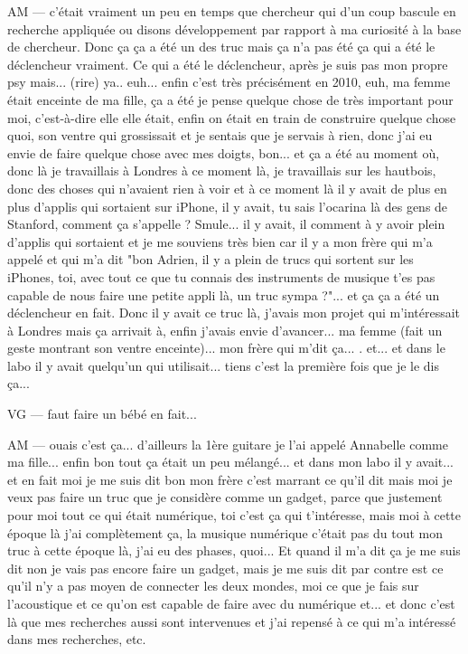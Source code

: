 AM — c'était vraiment un peu en temps que chercheur qui d'un coup bascule en recherche appliquée ou disons développement par rapport à ma curiosité à la base de chercheur. Donc ça ça a été un des truc mais ça n'a pas été ça qui a été le déclencheur vraiment.
Ce qui a été le déclencheur, après je suis pas mon propre psy mais... (rire) ya.. euh... enfin c'est très précisément en 2010, euh, ma femme était enceinte de ma fille, ça a été je pense  quelque chose de très important pour moi, c'est-à-dire elle elle était, enfin on était en train de construire quelque chose quoi, son ventre qui grossissait et je sentais que je servais à rien, donc j'ai eu envie de faire quelque chose avec mes doigts, bon... 
et ça a été au moment où, donc là je travaillais à Londres à ce moment là, je travaillais sur les hautbois, donc des choses qui n'avaient rien à voir et à ce moment là il y avait de plus en plus d'applis qui sortaient sur iPhone, il y avait, tu sais l'ocarina là des gens de Stanford, comment ça s'appelle ? Smule... il y avait, il comment à y avoir plein d'applis qui sortaient et je me souviens très bien car il y a mon frère qui m'a appelé et qui m'a dit "bon Adrien, il y a plein de trucs qui sortent sur les iPhones, toi, avec tout ce que tu connais des instruments de musique t'es pas capable de nous faire une petite appli là, un truc sympa ?"... et ça ça a été un déclencheur en fait.
Donc il y avait ce truc là, j'avais mon projet qui m'intéressait à Londres mais ça arrivait à, enfin j'avais envie d'avancer... ma femme (fait un geste montrant son ventre enceinte)... mon frère qui m'dit ça... . et... et dans le labo il y avait quelqu'un qui utilisait... tiens c'est la première fois que je le dis ça... 

VG — faut faire un bébé en fait... 

AM — ouais c'est ça... d'ailleurs la 1ère guitare je l'ai appelé Annabelle comme ma fille... enfin bon tout ça était un peu mélangé... 
et dans mon labo il y avait... et en fait moi je me suis dit bon mon frère c'est marrant ce qu'il dit mais moi je veux pas faire un truc que je considère comme un gadget, parce que justement pour moi tout ce qui était numérique, toi c'est ça qui t'intéresse, mais moi à cette époque là j'ai complètement ça, la musique numérique c'était pas du  tout mon truc à cette époque là, j'ai eu des phases, quoi... Et quand il m'a dit ça je me suis dit non je vais pas encore faire un gadget,  mais je me suis dit par contre est ce qu'il n'y a pas moyen de connecter les deux mondes, moi ce que je fais sur l'acoustique et ce qu'on est capable de faire avec du numérique et... et donc c'est là que mes recherches aussi sont intervenues et j'ai repensé à ce qui m'a intéressé dans mes recherches, etc.

